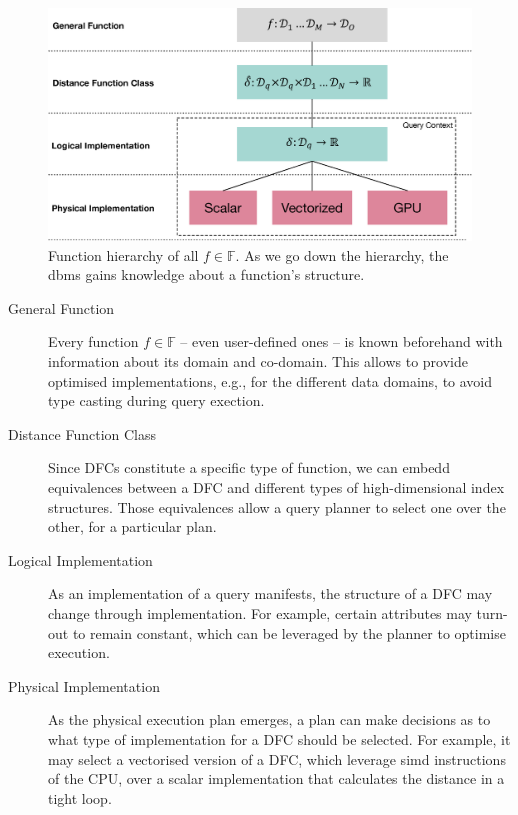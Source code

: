 \begin{figure}[bt]
    \centering
    \includegraphics[width=\textwidth]{figures/function_hierarchy.eps}
    \caption{Function hierarchy of all $f \in \mathbb{F}$. As we go down the hierarchy, the \acrshort{dbms} gains knowledge about a function's structure.}
    \label{figure:function_hierarchy}
\end{figure}

\begin{description}
    \item[General Function] Every function $f \in \mathbb{F}$ -- even user-defined ones -- is known beforehand with information about its domain and co-domain. This allows to provide optimised implementations, e.g., for the different data domains, to avoid type casting during query exection.
    \item[Distance Function Class] Since DFCs constitute a specific type of function, we can embedd equivalences between a DFC and different types of high-dimensional index structures. Those equivalences allow a query planner to select one over the other, for a particular plan.
    \item[Logical Implementation] As an implementation of a query manifests, the structure of a DFC may change through implementation. For example, certain attributes may turn-out to remain constant, which can be leveraged by the planner to optimise execution.
    \item[Physical Implementation] As the physical execution plan emerges, a plan can make decisions as to what type of implementation for a DFC should be selected. For example, it may select a vectorised version of a DFC, which leverage \acrfull{simd} instructions of the CPU, over a scalar implementation that calculates the distance in a tight loop.
\end{description}


